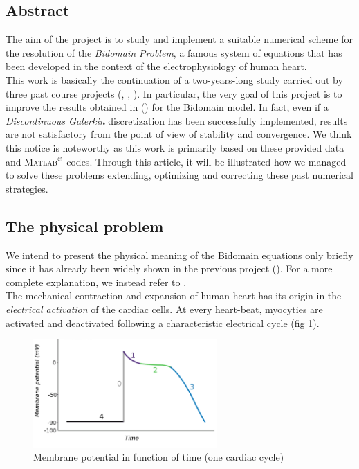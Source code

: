 \documentclass[a4paper,11pt]{article}
\begin{document}
    \subsection{Abstract}
    The aim of the project is to study and implement a suitable numerical scheme for the resolution of the \emph{Bidomain Problem}, a famous system of equations that has been developed in the context of the electrophysiology of human heart. \\
    This work is basically the continuation of a two-years-long study carried out by three past course projects (\cite{bagnara}, \cite{andreotti}, \cite{marta}). In particular, the very goal of this project is to improve the results obtained in \parencite{marta} (\citeauthor{marta}) for the Bidomain model. In fact, even if a \emph{Discontinuous Galerkin} discretization has been successfully implemented, results are not satisfactory from the point of view of stability and convergence. We think this notice is noteworthy as this work is primarily based on these provided data and \textsc{Matlab}$^ \copyright$ codes. Through this article, it will be illustrated how we managed to solve these problems extending, optimizing and correcting these past numerical strategies.
    
    \subsection{The physical problem}
    We intend to present the physical meaning of the Bidomain equations only briefly since it has already been widely shown in the previous project (\citeauthor{marta}). For a more complete explanation, we instead refer to \cite{acta}.\\
    The mechanical contraction and expansion of human heart has its origin in the \emph{electrical activation} of the cardiac cells. At every heart-beat, myocyties are activated and deactivated following a characteristic electrical cycle (fig \ref{potential_cycle}). 
    
    
    \begin{figure}[h]
    \begin{center}
    \includegraphics[width = 7cm]{./potential_cycle.png}
    \caption{Membrane potential in function of time (one cardiac cycle)}
    \label{potential_cycle}
    \end{center}
    \end{figure}
    
\end{document}
